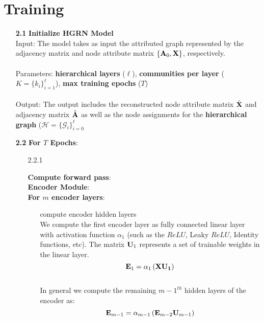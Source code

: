 \documentclass[a4paper,12pt]{article}
\newcommand{\forceindent}{\leavevmode{\parindent=2em\indent}}
\begin{document}
	\section{Training}
	\begin{itemize}
	\item[\bf 2.1]{\textbf{Initialize HGRN Model} \\
		Input: The model takes as input the attributed graph represented by the adjacency matrix and node attribute matrix $\{{\bf A}_0, {\bf X}\}$, respectively. \\
		\\
		Parameters: \textbf{hierarchical layers} ($\ell$), \textbf{communities per layer} ($K =\{k_i\}_{i=1}^\ell$), \textbf{max training epochs} ($T$) \\
		\\
		Output: The output includes the reconstructed node attribute matrix $\hat{\bf X}$ and adjacency matrix $\hat{\bf A}$ as well as the node assignments for the \textbf{hierarchical graph} ($\mathcal{H} = \{\mathcal{G}_i\}_{i = 0}^\ell$
	}

	\item[\bf 2.2]{\textbf{For $T$ Epochs}:}
		\begin{enumerate}
			\item[2.2.1]{\textbf{Compute forward pass}: \\
			
			 \forceindent \textbf{Encoder Module}: \\
			 \forceindent \textbf{For $m$ encoder layers}: 
			\begin{enumerate}
				\item[]{compute encoder hidden layers \\
					We compute the first encoder layer as fully connected linear layer with activation function $\alpha_{1}$ (such as the $ReLU$, Leaky $ReLU$, Identity functions, etc). The matrix ${\bf U}_1$ represents a set of trainable weights in the linear layer. 
					\[{\bf E}_1 = \alpha_1\left({\bf X{\bf U}_1}\right)\]
					\\
					In general we compute the remaining $m-1^{th}$ hidden layers of the encoder as:
					\[{\bf E}_{m-1} = \alpha_{m-1}\left({\bf E}_{m-2}{\bf U}_{m-1}\right)\]}
				

\end{enumerate}}
\end{enumerate}
\end{itemize}
\end{document}
